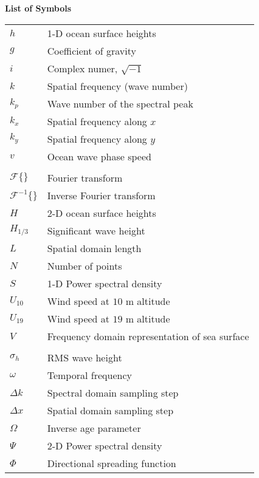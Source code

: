\noindent\Large{\bf{List of Symbols}}

\vspace{24pt}

\small\normalsize
\begin{supertabular}{ll}
$h$ & 1-D ocean surface heights\\
$g$ & Coefficient of gravity \\
$i$ & Complex numer, $\sqrt{-1}$ \\
$k$ & Spatial frequency (wave number) \\
$k_p$ & Wave number of the spectral peak \\
$k_x$ & Spatial frequency along $x$ \\
$k_y$ & Spatial frequency along $y$ \\
$v$ & Ocean wave phase speed \\
\\
$\mathcal{F}\{\}$ & Fourier transform \\
$\mathcal{F}^{-1}\{\}$ & Inverse Fourier transform \\
$H$ & 2-D ocean surface heights\\
$H_{1/3}$ & Significant wave height \\
$L$ & Spatial domain length \\
$N$ & Number of points \\
$S$ & 1-D Power spectral density \\
$U_{10}$ & Wind speed at $10$ m altitude \\
$U_{19}$ & Wind speed at $19$ m altitude \\
$V$ & Frequency domain representation of sea surface\\
\\
$\sigma_h$ & RMS wave height \\
$\omega$ & Temporal frequency \\
$\Delta k$ & Spectral domain sampling step \\
$\Delta x$ & Spatial domain sampling step \\
$\Omega$ & Inverse age parameter \\
$\Psi $ & 2-D Power spectral density \\
$\Phi $ & Directional spreading function\\
\end{supertabular}